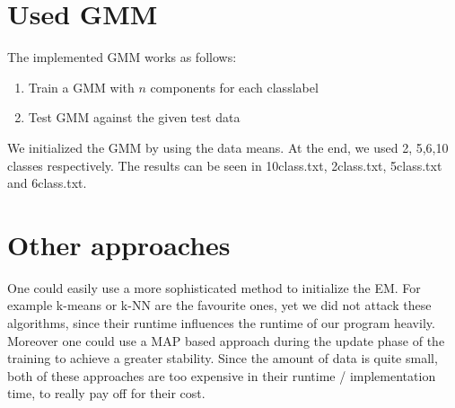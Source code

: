\section{Used GMM}
The implemented GMM works as follows:
\begin{enumerate}
\item Train a GMM with $n$ components for each classlabel
\item Test GMM against the given test data
\end{enumerate}
We initialized the GMM by using the data means. 
At the end, we used 2, 5,6,10 classes respectively. The results can be seen in 10class.txt, 2class.txt, 5class.txt and 6class.txt.

\section{Other approaches}
One could easily use a more sophisticated method to initialize the EM. For example k-means or k-NN are the favourite ones, yet we did not attack these algorithms, since their runtime influences the runtime of our program heavily. Moreover one could use a MAP based approach during the update phase of the training to achieve a greater stability.
Since the amount of data is quite small, both of these approaches are too expensive in their runtime / implementation time, to really pay off for their cost.